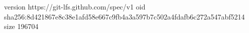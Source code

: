 version https://git-lfs.github.com/spec/v1
oid sha256:8d421867e8c38e1afd58e667c9fb4a3a597b7c502a4fdafb6c272a547abf5214
size 196704
